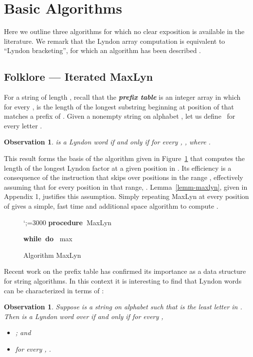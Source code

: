 \documentclass[10pt]{llncs}
\newtheorem{obs}[thrm]{Observation}
\def\s#1{\mbox{\boldmath }}
\def\itbf#1{\textit{\textbf{#1}}}
\def\bproc{{\bf procedure\ }}
\def\bwhile{{\bf while\ }}
\def\bdo{{\bf do\ }}
\def\bif{{\bf if\ }}
\def\bthen{{\bf then\ }}
\def\belse{{\bf else\ }}
\def\breturn{{\bf return\ }}
\def\q{\quad}
\def\qq{\qquad}
\begin{document}
\section{Basic Algorithms}
\label{sect-folklore}
Here we outline three algorithms
for which no clear exposition is available in the literature.
We remark that the Lyndon array computation is equivalent to ``Lyndon bracketing'',
for which an  algorithm has been described \cite{SR03}.

\subsection{Folklore --- Iterated MaxLyn}
\label{subsect-maxlyn}
For a string \s{x} of length ,
recall that the \itbf{prefix table} 
is an integer array in which for every ,
 is the length of the longest substring beginning at position 
of \s{x} that matches a prefix of \s{x}.
Given a nonempty string \s{x} on alphabet , let us define \ for every letter .

\begin{obs}
\label{obs2}
\s{x} is a Lyndon word if and only if for every ,
, where .
\end{obs}
This result forms the basis of the algorithm
given in Figure~\ref{fig-maxlyn} that computes
the length 
of the longest Lyndon factor at a given position  in .
Its efficiency is a consequence of the instruction
 that skips over positions in the range ,
effectively assuming that for every position 
in that range, .
Lemma~\ref{lemm-maxlyn}, given in Appendix 1, justifies this assumption.
Simply repeating MaxLyn at every position  of \s{x}
gives a simple, fast  time and  additional space
algorithm to compute .

\begin{figure}[ht]
{\leftskip=2.5cm\obeylines\sfcode`;=3000
\bproc MaxLyn

\bwhile  \bdo
\q 
\q \bwhile  \bdo
\qq 
\q \bif  \bthen
\qq 
\q \belse
\qq \breturn max
}
\caption{Algorithm MaxLyn}
\label{fig-maxlyn}
\end{figure}
Recent work on the prefix table
\cite{BKS13,CRSW15} has confirmed its importance as a data structure
for string algorithms.
In this context it is interesting to find that Lyndon words \s{x}
can be characterized in terms of :
\begin{obs}
\label{obs-prefix}
Suppose  is a string on alphabet 
such that  is the least letter in \s{x}.
Then \s{x} is a Lyndon word over  if and only if
for every ,
\begin{itemize}
\item[]
; and
\item[]
for every ,
.
\end{itemize}
\end{obs}
\end{document}
